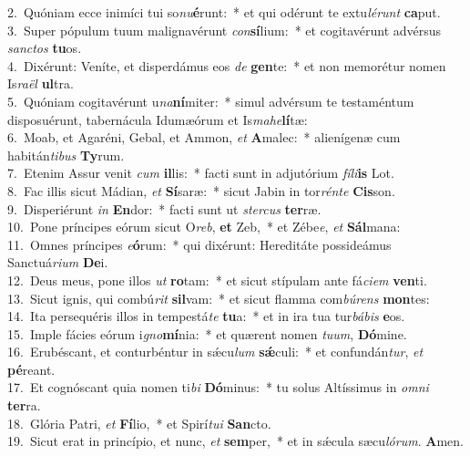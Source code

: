 {2.~}Quóniam ecce inimíci tui so\textit{nu}\textbf{é}runt:~* et qui odérunt te extu\textit{lé}\textit{runt} \textbf{ca}put.\\
{3.~}Super pópulum tuum malignavérunt \textit{con}\textbf{sí}lium:~* et cogitavérunt advérsus \textit{san}\textit{ctos} \textbf{tu}os.\\
{4.~}Dixérunt: Veníte, et disperdámus eos \textit{de} \textbf{gen}te:~* et non memorétur nomen Is\textit{ra}\textit{ël} \textbf{ul}tra.\\
{5.~}Quóniam cogitavérunt u\textit{na}\textbf{ní}miter:~* simul advérsum te testaméntum disposuérunt, tabernácula Idumæórum et Is\textit{ma}\textit{he}\textbf{lí}tæ:\\
{6.~}Moab, et Agaréni, Gebal, et Ammon, \textit{et} \textbf{A}malec:~* alienígenæ cum habitán\textit{ti}\textit{bus} \textbf{Ty}rum.\\
{7.~}Etenim Assur venit \textit{cum} \textbf{il}lis:~* facti sunt in adjutórium \textit{fí}\textit{li}\textbf{is} Lot.\\
{8.~}Fac illis sicut Mádian, \textit{et} \textbf{Sí}saræ:~* sicut Jabin in tor\textit{rén}\textit{te} \textbf{Cis}son.\\
{9.~}Disperiérunt \textit{in} \textbf{En}dor:~* facti sunt ut \textit{ster}\textit{cus} \textbf{ter}ræ.\\
{10.~}Pone príncipes eórum sicut O\textit{reb}, \textbf{et} Zeb,~* et Zébe\textit{e}, \textit{et} \textbf{Sál}mana:\\
{11.~}Omnes príncipes \textit{e}\textbf{ó}rum:~* qui dixérunt: Hereditáte possideámus Sanctuá\textit{ri}\textit{um} \textbf{De}i.\\
{12.~}Deus meus, pone illos \textit{ut} \textbf{ro}tam:~* et sicut stípulam ante fá\textit{ci}\textit{em} \textbf{ven}ti.\\
{13.~}Sicut ignis, qui combú\textit{rit} \textbf{sil}vam:~* et sicut flamma com\textit{bú}\textit{rens} \textbf{mon}tes:\\
{14.~}Ita persequéris illos in tempestá\textit{te} \textbf{tu}a:~* et in ira tua tur\textit{bá}\textit{bis} \textbf{e}os.\\
{15.~}Imple fácies eórum i\textit{gno}\textbf{mí}nia:~* et quærent nomen \textit{tu}\textit{um}, \textbf{Dó}mine.\\
{16.~}Erubéscant, et conturbéntur in sǽcu\textit{lum} \textbf{sǽ}culi:~* et confundán\textit{tur}, \textit{et} \textbf{pé}reant.\\
{17.~}Et cognóscant quia nomen ti\textit{bi} \textbf{Dó}minus:~* tu solus Altíssimus in \textit{om}\textit{ni} \textbf{ter}ra.\\
{18.~}Glória Patri, \textit{et} \textbf{Fí}lio,~* et Spirí\textit{tu}\textit{i} \textbf{San}cto.\\
{19.~}Sicut erat in princípio, et nunc, \textit{et} \textbf{sem}per,~* et in sǽcula sæcu\textit{ló}\textit{rum}. \textbf{A}men.\\
